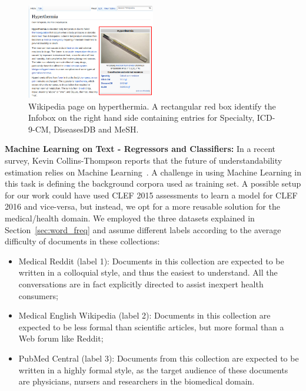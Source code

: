\begin{figure}[th!]
   \centering
   \includegraphics[width=0.50\textwidth]{graphics/hyperthermia}
    \caption{Wikipedia page on hyperthermia. A rectangular red box identify the Infobox on the right hand side containing entries for Specialty, ICD-9-CM, DiseasesDB and MeSH.}
    \label{fig:hyperthermia}
\end{figure}



\textbf{Machine Learning on Text - Regressors and Classifiers:}
In a recent survey, Kevin Collins-Thompson reports that the future of understandability estimation relies on Machine Learning~\cite{collins2014computational}.
A challenge in using Machine Learning in this task is defining the background corpora used as training set.
A possible setup for our work could have used CLEF 2015 assessments to learn a model for CLEF 2016 and vice-versa, but instead, we opt for a 
more reusable solution for the medical/health domain. 
We employed the three datasets explained in Section~\ref{sec:word_freq} and assume different labels according to the average difficulty of documents in these collections:

\begin{itemize}
    \item Medical Reddit (label 1): Documents in this collection are expected to be written in a colloquial style, and thus the easiest to understand. All the conversations are in fact explicitly directed to assist inexpert health consumers;
    \item Medical English Wikipedia (label 2): Documents in this collection are expected to be less formal than scientific articles, but more formal than a Web forum like Reddit;
    \item PubMed Central (label 3): Documents from this collection are expected to be written in a highly formal style, as the target audience of these documents are physicians, nursers and researchers in the biomedical domain.
\end{itemize}

